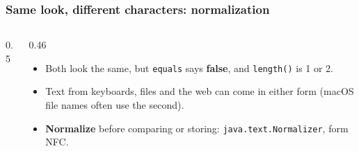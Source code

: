 \documentclass[aspectratio=169,10pt,compress]{beamer}
\begin{document}
\begin{frame}[t,fragile] \frametitle{Same look, different characters: normalization}
  \begin{columns}[T]
    \begin{column}{0.5\textwidth}
      \begin{center}
      \end{center}
    \end{column}
    \begin{column}{0.46\textwidth}
      \begin{itemize}\small
        \item Both look the same, but \texttt{equals} says \textbf{false}, and \texttt{length()} is 1 or 2.
        \item Text from keyboards, files and the web can come in either form (macOS file names often use the second).
        \item \textbf{Normalize} before comparing or storing: \texttt{java.text.Normalizer}, form NFC.
      \end{itemize}
    \end{column}
  \end{columns}
\end{frame}

\end{document}
